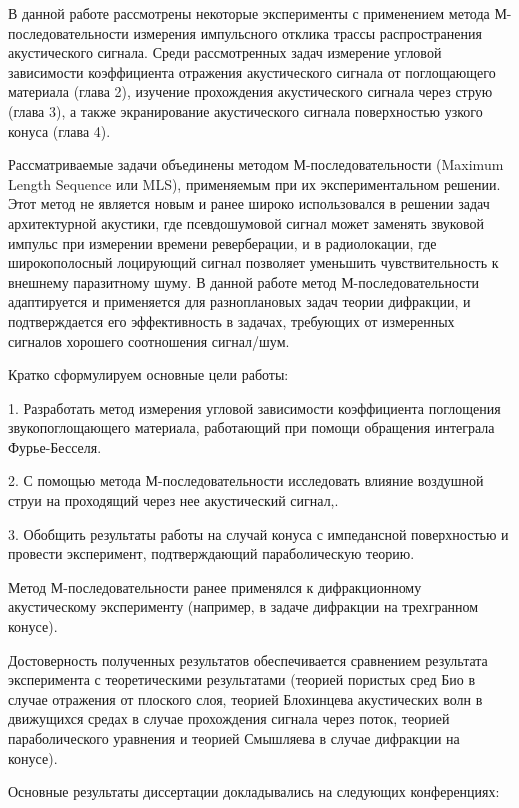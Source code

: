 {\aim} В данной работе рассмотрены некоторые эксперименты с применением метода М-последовательности измерения импульсного отклика трассы распространения акустического сигнала. Среди рассмотренных задач измерение угловой зависимости коэффициента отражения акустического сигнала от поглощающего материала (глава 2), изучение прохождения акустического сигнала через струю (глава 3), а также экранирование акустического сигнала поверхностью узкого конуса (глава 4).

Рассматриваемые задачи объединены методом М-последовательности (Maximum Length Sequence или MLS), применяемым при их экспериментальном решении. Этот метод не является новым и ранее широко использовался в решении задач архитектурной акустики, где псевдошумовой сигнал может заменять звуковой импульс при измерении времени реверберации, и в радиолокации, где широкополосный лоцирующий сигнал позволяет уменьшить чувствительность к внешнему паразитному шуму. В данной работе метод М-последовательности адаптируется и применяется для разноплановых задач теории дифракции, и подтверждается его эффективность в задачах, требующих от измеренных сигналов хорошего соотношения сигнал/шум.

Кратко сформулируем основные цели работы:

1. Разработать метод измерения угловой зависимости коэффициента поглощения звукопоглощающего материала, работающий при помощи обращения интеграла Фурье-Бесселя.

2. С помощью метода М-последовательности исследовать влияние воздушной струи на проходящий через нее акустический сигнал,.

3. Обобщить результаты работы \cite{Shanin2011} на случай конуса с импедансной поверхностью и провести эксперимент, подтверждающий параболическую теорию.

{\novelty} Метод М-последовательности ранее применялся к дифракционному акустическому эксперименту (например, \cite{ValeraPhdthesis} в задаче дифракции на трехгранном конусе). 

{\reliability} Достоверность полученных результатов обеспечивается сравнением результата эксперимента с теоретическими результатами (теорией пористых сред Био в случае отражения от плоского слоя, теорией Блохинцева акустических волн в движущихся средах в случае прохождения сигнала через поток, теорией параболического уравнения и теорией Смышляева в случае дифракции на конусе).

{\probation} 
Основные результаты диссертации докладывались на следующих конференциях:

